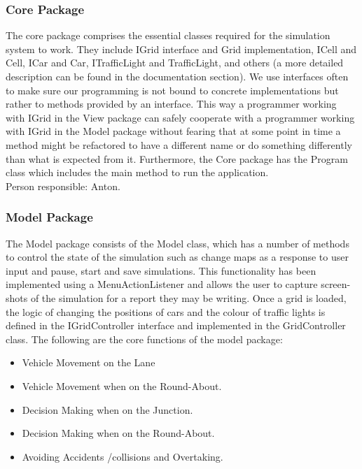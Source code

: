 \documentclass{article}
\begin{document}
	\subsubsection{Core Package}
	The core package comprises the essential classes required for the simulation system to work. They include IGrid interface and Grid implementation, ICell and Cell, ICar and Car, ITrafficLight and TrafficLight, and others (a more detailed description can be found in the documentation section). 
	We use interfaces often to make sure our programming is not bound to concrete implementations but rather to methods provided by an interface. 
	This way a programmer working with IGrid in the View package can safely cooperate with a programmer working with IGrid in the Model package without fearing that at some point in time a method might be refactored to have a different name or do something differently than what is expected from it. 
	Furthermore, the Core package has the Program class which includes the main method to run the application.\\
	
	\noindent
	Person responsible: Anton. 
	
	\subsubsection{Model Package}
	The Model package consists of the Model class, which has a number of methods to control the state of the simulation such as change maps as a response to user input and pause, start and save simulations. This functionality has been implemented using a MenuActionListener and allows the user to capture screen-shots of the simulation for a report they may be writing.
	Once a grid is loaded, the logic of changing the positions of cars and the colour of traffic lights is defined in the IGridController interface and implemented in the GridController class.
	The following are the core functions of the model package:
		
		\begin{itemize}
			\item Vehicle Movement on the Lane
			\item Vehicle Movement when on the Round-About.
			\item Decision Making when on the Junction.
			\item Decision Making when on the Round-About.
			\item Avoiding Accidents /collisions and Overtaking.
		\end{itemize}
		\vspace{0.5cm}	
	
\end{document}
